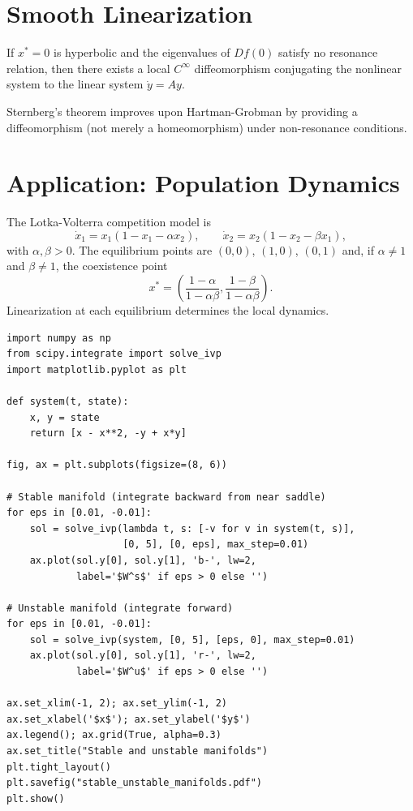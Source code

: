 \section{Smooth Linearization}

\begin{theorem}[Sternberg]
If $x^* = 0$ is hyperbolic and the eigenvalues of $Df(0)$ satisfy no
resonance relation, then there exists a local $C^\infty$ diffeomorphism
conjugating the nonlinear system to the linear system $\dot{y} = Ay$.
\end{theorem}

\begin{remark}
Sternberg's theorem improves upon Hartman-Grobman by providing a
diffeomorphism (not merely a homeomorphism) under non-resonance conditions.
\end{remark}

\section{Application: Population Dynamics}

\begin{example}
The Lotka-Volterra competition model is
\[
    \dot{x}_1 = x_1(1 - x_1 - \alpha x_2), \qquad
    \dot{x}_2 = x_2(1 - x_2 - \beta x_1),
\]
with $\alpha, \beta > 0$. The equilibrium points are $(0,0)$, $(1,0)$,
$(0,1)$ and, if $\alpha \neq 1$ and $\beta \neq 1$, the coexistence point
\[
    x^* = \left(\frac{1-\alpha}{1-\alpha\beta}, \frac{1-\beta}{1-\alpha\beta}\right).
\]
Linearization at each equilibrium determines the local dynamics.
\end{example}

\begin{codeblock}[title=\textbf{Stable and unstable manifolds of a saddle}]
\begin{verbatim}
import numpy as np
from scipy.integrate import solve_ivp
import matplotlib.pyplot as plt

def system(t, state):
    x, y = state
    return [x - x**2, -y + x*y]

fig, ax = plt.subplots(figsize=(8, 6))

# Stable manifold (integrate backward from near saddle)
for eps in [0.01, -0.01]:
    sol = solve_ivp(lambda t, s: [-v for v in system(t, s)],
                    [0, 5], [0, eps], max_step=0.01)
    ax.plot(sol.y[0], sol.y[1], 'b-', lw=2,
            label='$W^s$' if eps > 0 else '')

# Unstable manifold (integrate forward)
for eps in [0.01, -0.01]:
    sol = solve_ivp(system, [0, 5], [eps, 0], max_step=0.01)
    ax.plot(sol.y[0], sol.y[1], 'r-', lw=2,
            label='$W^u$' if eps > 0 else '')

ax.set_xlim(-1, 2); ax.set_ylim(-1, 2)
ax.set_xlabel('$x$'); ax.set_ylabel('$y$')
ax.legend(); ax.grid(True, alpha=0.3)
ax.set_title("Stable and unstable manifolds")
plt.tight_layout()
plt.savefig("stable_unstable_manifolds.pdf")
plt.show()
\end{verbatim}
\end{codeblock}

